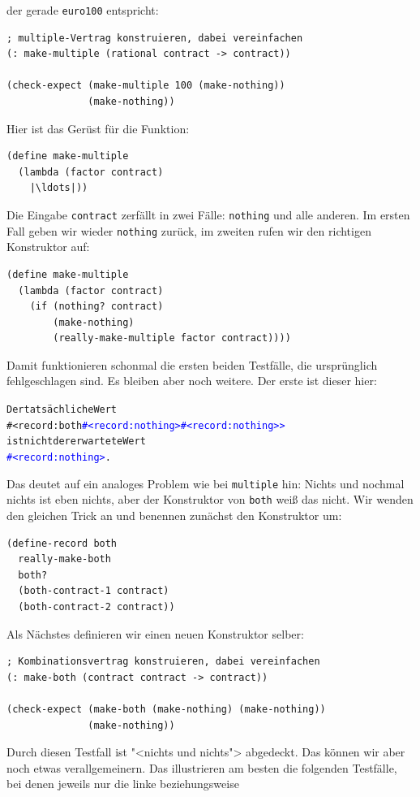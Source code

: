der gerade \lstinline{euro100} entspricht:
%
\begin{lstlisting}
; multiple-Vertrag konstruieren, dabei vereinfachen
(: make-multiple (rational contract -> contract))

(check-expect (make-multiple 100 (make-nothing))
              (make-nothing))
\end{lstlisting}
%
Hier ist das Gerüst für die Funktion:
%
\begin{lstlisting}
(define make-multiple
  (lambda (factor contract)
    |\ldots|))
\end{lstlisting}
%
Die Eingabe \lstinline{contract} zerfällt in zwei Fälle:
\lstinline{nothing} und alle anderen.  Im ersten Fall geben
wir wieder \lstinline{nothing} zurück, im zweiten
rufen wir den richtigen Konstruktor auf:
%
\begin{lstlisting}
(define make-multiple
  (lambda (factor contract)
    (if (nothing? contract)
        (make-nothing)
        (really-make-multiple factor contract))))
\end{lstlisting}
%
Damit funktionieren schonmal die ersten beiden Testfälle, die
ursprünglich fehlgeschlagen sind.  Es bleiben aber noch weitere.  Der erste
ist dieser hier:
%
\begin{alltt}
Der tatsächliche Wert
#<record:both \textcolor{blue}{#<record:nothing> #<record:nothing>>}
ist nicht der erwartete Wert
\textcolor{blue}{#<record:nothing>}.
\end{alltt}
%
Das deutet auf ein analoges Problem wie bei \lstinline{multiple} hin:
Nichts und nochmal nichts ist eben nichts, aber der Konstruktor von
\lstinline{both} weiß das nicht.  Wir wenden den gleichen Trick an und
benennen zunächst den Konstruktor um:
%
\begin{lstlisting}
(define-record both
  really-make-both
  both?
  (both-contract-1 contract)
  (both-contract-2 contract))  
\end{lstlisting}
%
Als Nächstes definieren wir einen neuen Konstruktor selber:
%
\begin{lstlisting}
; Kombinationsvertrag konstruieren, dabei vereinfachen
(: make-both (contract contract -> contract))

(check-expect (make-both (make-nothing) (make-nothing)) 
              (make-nothing))
\end{lstlisting}
%
Durch diesen Testfall ist "<nichts und nichts"> abgedeckt.  Das können
wir aber noch etwas verallgemeinern.  Das illustrieren am besten die
folgenden Testfälle, bei denen jeweils nur die linke beziehungsweise
